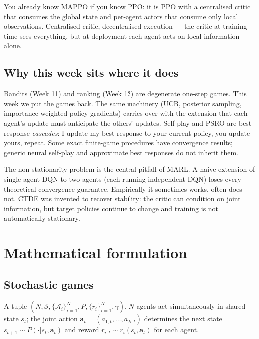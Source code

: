 \documentclass[11pt,oneside]{scrbook}
\begin{document}
You already know MAPPO if you know PPO: it is PPO with a centralised critic
that consumes the global state and per-agent actors that consume only
local observations. Centralised critic, decentralised execution --- the
critic at training time sees everything, but at deployment each agent
acts on local information alone.

\section{Why this week sits where it does}

Bandits (Week 11) and ranking (Week 12) are degenerate one-step games.
This week we put the games back. The same machinery (UCB, posterior
sampling, importance-weighted policy gradients) carries over with the
extension that each agent's update must anticipate the others' updates.
Self-play and PSRO are best-response \emph{cascades}: I update my best
response to your current policy, you update yours, repeat. Some exact finite-game procedures have convergence results; generic
neural self-play and approximate best responses do not inherit them.

\begin{pitfall}
The non-stationarity problem is the central pitfall of MARL. A naive
extension of single-agent DQN to two agents (each running independent DQN)
loses every theoretical convergence guarantee. Empirically it sometimes
works, often does not. CTDE was invented to recover stability: the critic can condition on joint information, but target policies
continue to change and training is not automatically stationary.
\end{pitfall}

\chapter{Mathematical formulation}

\section{Stochastic games}

\begin{definition}
A tuple $(N, \mathcal{S}, \{\mathcal{A}_i\}_{i=1}^N, P, \{r_i\}_{i=1}^N, \gamma)$.
$N$ agents act simultaneously in shared state $s_t$; the joint action
$\mathbf{a}_t = (a_{1,t}, \dots, a_{N,t})$ determines the next state
$s_{t+1} \sim P(\cdot | s_t, \mathbf{a}_t)$ and reward
$r_{i,t} \sim r_i(s_t, \mathbf{a}_t)$ for each agent.
\end{definition}
\end{document}
